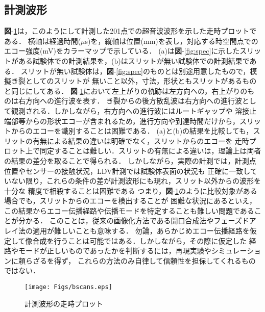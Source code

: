 \subsection{計測波形}
{\bf 図}-\ref{fig:bscans}は，このようにして計測した201点での超音波波形を示した走時プロットである．
横軸は経過時間($\mu$s)を，縦軸は位置(mm)を表し，対応する時空間点でのエコー強度(mV)をカラーマップで示している．
(a)は{\bf 図}-\ref{fig:spec}に示したスリットがある試験体での計測結果を，(b)はスリットが無い試験体での計測結果である．
スリットが無い試験体は，{\bf 図}-\ref{fig:spec}のものとは別途用意したもので，模擬き裂としてのスリットが
無いこと以外，寸法，形状ともスリットがあるものと同じにしてある．
{\bf 図}-\ref{fig:bscans}において左上がりの軌跡は左方向への，右上がりのものは右方向への進行波を表す．
き裂からの後方散乱波は右方向への進行波として観測される．しかしながら，右方向への進行波にはルートギャップや
溶接止端部等からの形状エコーが含まれるため，進行方向や到達時間だけから，スリットからのエコーを識別することは困難である． 
(a)と(b)の結果を比較しても，スリットの有無による結果の違いは明確でなく，スリットからのエコーを
走時プロット上で同定することは難しい．スリットの有無による違いは，理論上は両者の結果の差分を取ることで得られる．
しかしながら，実際の計測では，計測点位置やセンサーの接触状況，LDV計測では試験体表面の状況も
正確に一致していない限り，これらの条件の差が計測波形にも現れ，スリット以外からの波形を十分な
精度で相殺することは困難である つまり，{\bf 図}-\ref{fig:bscans}のように比較対象がある場合でも，スリットからのエコーを検出することが
困難な状況にあるといえ，この結果からエコー伝播経路や伝播モードを特定することも難しい問題であることが分かる．
このことは，従来の画像化方法である開口合成法やフェーズドアレイ法の適用が難しいことも意味する．
勿論，あらかじめエコー伝播経路を仮定して像合成を行うことは可能ではある．しかしながら，その際に仮定した
経路やモードが正しいものであったかを判断するには，再現実験やシミュレーションに頼らざるを得ず，
これらの方法のみ自律して信頼性を担保してくれるものではない．
\begin{figure}[htb]
\centering
	\texttt{[image: Figs/bscans.eps]}
	\caption{計測波形の走時プロット}
	\label{fig:bscans}
\end{figure}

